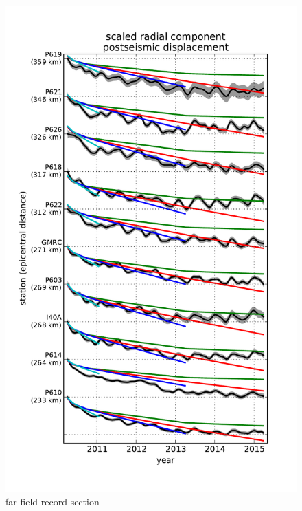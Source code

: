 \documentclass[12pt]{article}
\begin{document}
\begin{figure}
\includegraphics[scale=0.9]{Figures/far_field_record_section}
\centering 
\caption{far field record section}
\label{fig:FarFieldRS}
\end{figure}        
\end{document}
